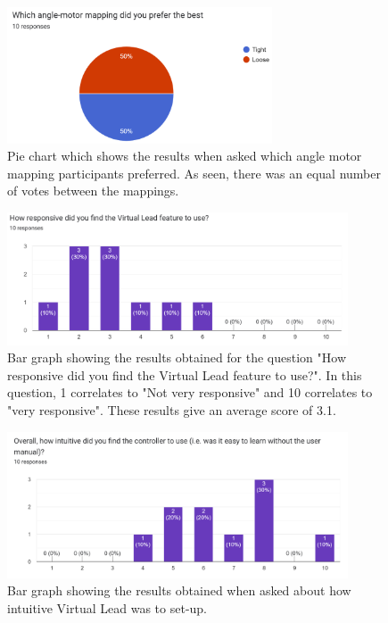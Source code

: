 \documentclass{l4proj}
\begin{document}
\begin{appendices}
\begin{figure}
    \centering
    \includegraphics[width=0.7\textwidth]{images/mapping-preference.png}
    \caption{Pie chart which shows the results when asked which angle motor mapping participants preferred. As seen, there was an equal number of votes between the mappings.}
    \label{fig:mapping-preference}
\end{figure}

\begin{figure}
    \centering
    \includegraphics[width=0.9\textwidth]{images/virtual-lead-responsive.png}
    \caption{Bar graph showing the results obtained for the question "How responsive did you find the Virtual Lead feature to use?". In this question, 1 correlates to "Not very responsive" and 10 correlates to "very responsive". These results give an average score of 3.1.}
    \label{fig:virtual-lead-responsive}
\end{figure}

\begin{figure}
    \centering
    \includegraphics[width=0.9\textwidth]{images/virtual-lead-intuition.png}
    \caption{Bar graph showing the results obtained when asked about how intuitive Virtual Lead was to set-up.}
    \label{fig:virtual-lead-intuition}
\end{figure}


\end{appendices}
\end{document}
